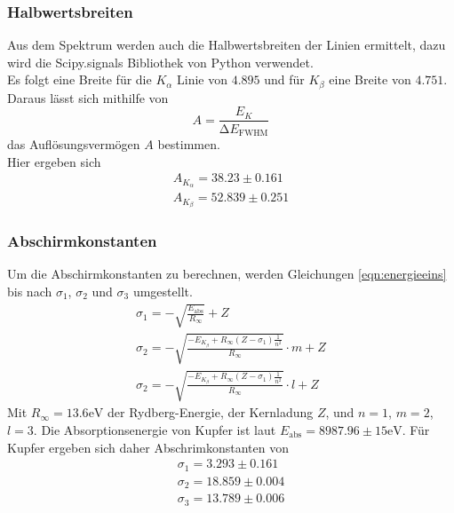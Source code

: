   \subsubsection{Halbwertsbreiten}
    Aus dem Spektrum werden auch die Halbwertsbreiten der Linien ermittelt, dazu wird die Scipy.signals Bibliothek von Python 
    verwendet. \\
    Es folgt eine Breite für die $K_{\alpha}$ Linie von $4.895$ und für $K_{\beta}$ eine Breite von $4.751$. Daraus lässt sich mithilfe von
    \begin{equation*}
      A = \frac{E_K}{\increment E_{\text{FWHM}}}
    \end{equation*}
    das Auflösungsvermögen $A$ bestimmen. \\
    Hier ergeben sich
    \begin{align*}
      A_{K_{\alpha}} = 38.23 \pm 0.161 \\
      A_{K_{\beta}} = 52.839 \pm 0.251
    \end{align*}

  \subsubsection{Abschirmkonstanten}
    Um die Abschirmkonstanten zu berechnen, werden Gleichungen \eqref{eqn:energieeins} bis %
    nach $\sigma_1$, $\sigma_2$ und $\sigma_3$ umgestellt.\\
    \begin{align*}
      \sigma_1 = - \sqrt{\frac{E_{\text{abs}}}{R_{\infty}}} + Z\\
      \sigma_2 = - \sqrt{\frac{- E_{K_{\beta}} + R_{\infty} (Z - \sigma_1) \frac{1}{n^2}}{R_{\infty}}} \cdot m + Z\\
      \sigma_2 = - \sqrt{\frac{- E_{K_{\beta}} + R_{\infty} (Z - \sigma_1) \frac{1}{n^2}}{R_{\infty}}} \cdot l + Z
    \end{align*}
    Mit $R_{\infty} = 13.6 \text{eV}$ der Rydberg-Energie, der Kernladung $Z$, und $n = 1$, $m = 2$, $l = 3$. 
    Die Absorptionsenergie von Kupfer ist laut \cite{nist} $E_{\text{abs}} = 8987.96 \pm 15 \text{eV}$.
    Für Kupfer ergeben sich daher Abschrimkonstanten von
    \begin{align*}
      \sigma_1 = 3.293 \pm 0.161\\
      \sigma_2 = 18.859 \pm 0.004\\
      \sigma_3 = 13.789 \pm 0.006
    \end{align*}

